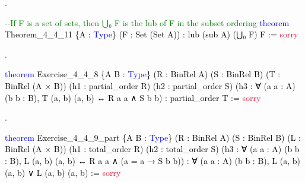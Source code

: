 \documentclass[
  letterpaper,
  DIV=11,
  numbers=noendperiod]{scrreprt}
\newenvironment{Shaded}{\begin{snugshade}}{\end{snugshade}}
\newcommand{\CommentTok}[1]{\textcolor[rgb]{0.37,0.37,0.37}{#1}}
\newcommand{\ConstantTok}[1]{\textcolor[rgb]{0.56,0.35,0.01}{#1}}
\newcommand{\KeywordTok}[1]{\textcolor[rgb]{0.00,0.23,0.31}{#1}}
\newcommand{\NormalTok}[1]{\textcolor[rgb]{0.00,0.23,0.31}{#1}}
\renewcommand{\NormalTok}[1]{\textcolor[HTML]{000000}{#1}}
\renewcommand{\KeywordTok}[1]{\textcolor[HTML]{0000FF}{#1}}
\renewcommand{\CommentTok}[1]{\textcolor[HTML]{008000}{#1}}
\renewcommand{\ConstantTok}[1]{\textcolor[HTML]{DC143C}{#1}}
\newcommand{\nobreakShaded}{\renewenvironment{Shaded}
	{\begin{tcolorbox}[frame hidden, enhanced, interior hidden, boxrule=0pt,
		borderline west={3pt}{0pt}{shadecolor}, sharp corners]}
	{\end{tcolorbox}}}
\newenvironment{numex}[1]
	{\begin{minipage}[t]{0.04\textwidth}\vspace{8pt}{#1}.
		\end{minipage}\nobreakShaded\begin{minipage}[t]{0.96\textwidth}\vspace{0pt}}
	{\end{minipage}}
\theoremstyle{remark}
\begin{document}
\begin{numex}{3}

\begin{Shaded}
\begin{Highlighting}[]
\CommentTok{{-}{-}If F is a set of sets, then ⋃₀ F is the lub of F in the subset ordering}
\KeywordTok{theorem}\NormalTok{ Theorem\_4\_4\_11 \{A : }\KeywordTok{Type}\NormalTok{\} (F : Set (Set A)) :}
\NormalTok{    lub (sub A) (⋃₀ F) F := }\ConstantTok{sorry}
\end{Highlighting}
\end{Shaded}

\end{numex}

\begin{numex}{4}

\begin{Shaded}
\begin{Highlighting}[]
\KeywordTok{theorem}\NormalTok{ Exercise\_4\_4\_8 \{A B : }\KeywordTok{Type}\NormalTok{\} (R : BinRel A) (S : BinRel B)}
\NormalTok{    (T : BinRel (A × B)) (h1 : partial\_order R) (h2 : partial\_order S)}
\NormalTok{    (h3 : ∀ (a a\textquotesingle{} : A) (b b\textquotesingle{} : B),}
\NormalTok{      T (a, b) (a\textquotesingle{}, b\textquotesingle{}) ↔ R a a\textquotesingle{} ∧ S b b\textquotesingle{}) :}
\NormalTok{    partial\_order T := }\ConstantTok{sorry}
\end{Highlighting}
\end{Shaded}

\end{numex}

\begin{numex}{5}

\begin{Shaded}
\begin{Highlighting}[]
\KeywordTok{theorem}\NormalTok{ Exercise\_4\_4\_9\_part \{A B : }\KeywordTok{Type}\NormalTok{\} (R : BinRel A) (S : BinRel B)}
\NormalTok{    (L : BinRel (A × B)) (h1 : total\_order R) (h2 : total\_order S)}
\NormalTok{    (h3 : ∀ (a a\textquotesingle{} : A) (b b\textquotesingle{} : B),}
\NormalTok{      L (a, b) (a\textquotesingle{}, b\textquotesingle{}) ↔ R a a\textquotesingle{} ∧ (a = a\textquotesingle{} → S b b\textquotesingle{})) :}
\NormalTok{    ∀ (a a\textquotesingle{} : A) (b b\textquotesingle{} : B),}
\NormalTok{      L (a, b) (a\textquotesingle{}, b\textquotesingle{}) ∨ L (a\textquotesingle{}, b\textquotesingle{}) (a, b) := }\ConstantTok{sorry}
\end{Highlighting}
\end{Shaded}

\end{numex}
\end{document}
